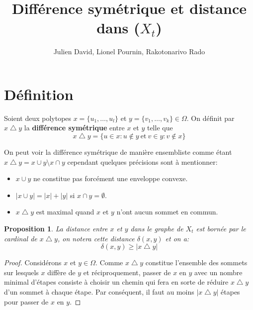 \documentclass[11pt]{article}
\newtheorem{proposition}{Proposition}
\begin{document}
\title{Différence symétrique et distance dans ($X_t$)}
\author{Julien David, Lionel Pournin, Rakotonarivo Rado}
\maketitle

\section{Définition}

Soient deux polytopes $x = \{u_1, \dots , u_l\}$ et $y = \{v_1, \dots , v_k\} \in \Omega$. On définit par $x \bigtriangleup y$ la \textbf{différence symétrique} entre $x$ et $y$ telle que
\begin{equation}
  x \bigtriangleup y = \{ u \in x : u \notin y \ \mbox{et} \ v \in y : v \notin x \}
\end{equation}

On peut voir la différence symétrique de manière ensembliste comme étant $x \bigtriangleup y = x \cup y \setminus x \cap y$ cependant quelques précisions sont à mentionner:

\begin{itemize}
  \item $x \cup y$ ne constitue pas forcément une enveloppe convexe.
  \item $|x \cup y| = |x| + |y|$ si $x \cap y = \emptyset$.
  \item $x \bigtriangleup y$ est maximal quand $x$ et $y$ n'ont aucun sommet en commun.
\end{itemize}

\begin{proposition}
  La distance entre $x$ et $y$ dans le graphe de $X_t$ est bornée par le cardinal de $x \bigtriangleup y$, on notera cette distance $\delta(x,y)$ et on a:
  \begin{equation}
    \delta(x,y) \geq{|x \bigtriangleup y|}
  \end{equation}
\end{proposition}

\begin{proof}
  Considérons $x$ et $y \in \Omega$. Comme $x \bigtriangleup y$ constitue l'ensemble des sommets sur lesquels $x$ diffère de $y$ et réciproquement, passer de $x$ en $y$ avec un nombre minimal d'étapes consiste à choisir un chemin qui fera en sorte de réduire $x \bigtriangleup y$ d'un sommet à chaque étape. Par conséquent, il faut au moins $|x \bigtriangleup y|$ étapes pour passer de $x$ en $y$.
\end{proof}
\end{document}
